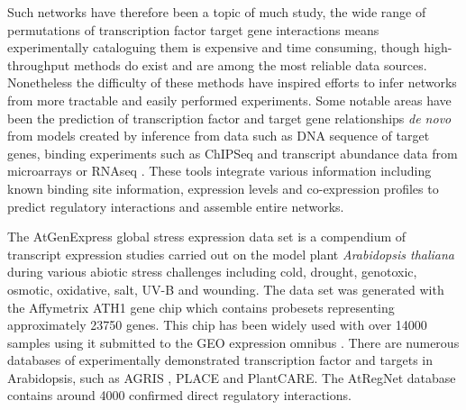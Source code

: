 \documentclass[12pt,a4paper,]{article}
\begin{document}
Such networks have therefore been a topic of much study, the wide range of permutations of transcription factor target gene interactions means experimentally cataloguing them is expensive and time consuming, though high-throughput methods do exist and are among the most reliable data sources. Nonetheless the difficulty of these methods have inspired efforts to infer networks from more tractable and easily performed experiments. Some notable areas have been the prediction of transcription factor and target gene relationships \emph{de novo} from models created by inference from data such as DNA sequence of target genes, binding experiments such as ChIPSeq and transcript abundance data from microarrays or RNAseq \citep[\citet{friedmaninferring2004},\citet{buttediscoverin2000},\citet{liangreveal1998}]{willesparse2004}. These tools integrate various information including known binding site information, expression levels and co-expression profiles to predict regulatory interactions and assemble entire networks.

The AtGenExpress global stress expression data set \citep{kilianatgenexpress2007} is a compendium of transcript expression studies carried out on the model plant \emph{Arabidopsis thaliana} during various abiotic stress challenges including cold, drought, genotoxic, osmotic, oxidative, salt, UV-B and wounding. The data set was generated with the Affymetrix ATH1 gene chip \citep{redman2004} which contains probesets representing approximately 23750 genes. This chip has been widely used with over 14000 samples using it submitted to the GEO expression omnibus \citep{barrett2013}. There are numerous databases of experimentally demonstrated transcription factor and targets in Arabidopsis, such as AGRIS \citep{palaniswamy2006}, PLACE and PlantCARE. The AtRegNet database contains around 4000 confirmed direct regulatory interactions.
\end{document}
